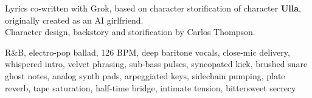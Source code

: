 

\begin{notes}
Lyrics co-written with Grok, based on character storification of character \textbf{Ulla}, originally created as an AI girlfriend.\\
Character design, backstory and storification by Carlos Thompson.
\end{notes}

\begin{style}
R\&B, electro-pop ballad, 126 BPM, deep baritone vocals, close-mic delivery, whispered intro, velvet phrasing, sub-bass pulses, syncopated kick, brushed snare ghost notes, analog synth pads, arpeggiated keys, sidechain pumping, plate reverb, tape saturation, half-time bridge, intimate tension, bittersweet secrecy
\end{style}


